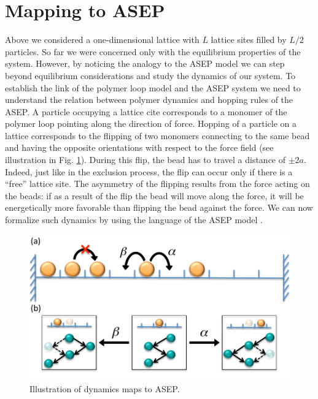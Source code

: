\documentclass[aps,showpacs,twocolumn,floatfix,prx,superscriptaddress]{revtex4-1}
\begin{document}
\section{Mapping to ASEP}\label{sec:asep}
Above we considered a one-dimensional lattice with $L$ lattice sites filled by $L/2$ particles. So far we were concerned only with the equilibrium properties of the system. However, by noticing the analogy to the ASEP model we can step
beyond equilibrium considerations and study the dynamics of our system. To establish the link of the polymer loop model and the ASEP system we need to understand the relation between polymer dynamics and hopping rules of the ASEP.  A particle occupying a lattice cite corresponds to a monomer of the polymer loop pointing along the direction of force. 
Hopping of a particle on a lattice corresponds to the flipping of two monomers connecting to the same bead and having the opposite orientations with respect to the force field (see illustration in Fig. \ref{fig:asep}). During this flip, the bead has to travel a distance of $\pm2a$. Indeed, just like in the exclusion process, the flip can occur only if there is a ``free'' lattice site. The asymmetry of the flipping results from the force acting on the beads: if as a result of the flip the bead will move along the force, it will be energetically more favorable than flipping the bead against the force. We can now formalize such dynamics by using the language of the ASEP model \cite{Derrida1998,Schutz2001}. 
 \begin{figure}[htpb]
     \centering
     \includegraphics[width=1.0\linewidth]{asep}
     \caption{Illustration of dynamics maps to ASEP.}
     \label{fig:asep}
 \end{figure}
\end{document}
